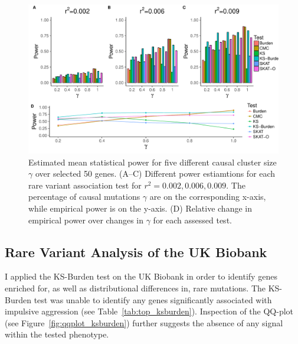 \begin{figure}[ht!]
  \centering
  \includegraphics[width=1.0\linewidth]{ksburden/figures/combined_power_analysis.pdf}
  \caption[Estimated Mean Statistical Power]{Estimated mean statistical power for five different causal cluster size $\gamma$ over selected 50 genes.
    (A--C) Different power estiamtions for each rare variant association test for $r^2=0.002, 0.006, 0.009$.
    The percentage of causal mutations $\gamma$ are on the corresponding x-axis, while empirical power is on the y-axis.
    (D) Relative change in empirical power over changes in $\gamma$ for each assessed test.\label{fig:simulatedGeneRealData}}
\end{figure}


\subsection{Rare Variant Analysis of the UK Biobank}
\label{sub:ukbiobank_aggression}

I applied the KS-Burden test on the UK Biobank in order to identify genes enriched for, as well as distributional differences in, rare mutations. 
The KS-Burden test was unable to identify any genes significantly associated with impulsive aggression (see Table~\ref{tab:top_ksburden}).
Inspection of the QQ-plot (see Figure~\ref{fig:qqplot_ksburden}) further suggests the absence of any signal within the tested phenotype.

